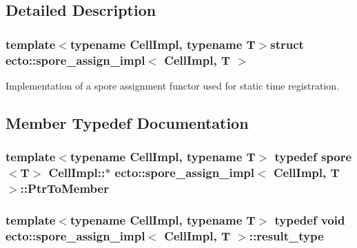 \subsection{Detailed Description}
\subsubsection*{template$<$typename Cell\-Impl, typename T$>$struct ecto\-::spore\-\_\-assign\-\_\-impl$<$ Cell\-Impl, T $>$}

Implementation of a spore assignment functor used for static time registration. 

\subsection{Member Typedef Documentation}
\hypertarget{structecto_1_1spore__assign__impl_a374a7ffdead1191878d49a6ef295ada6}{
\subsubsection[{Ptr\-To\-Member}]{\setlength{\rightskip}{0pt plus 5cm}template$<$typename Cell\-Impl, typename T$>$ typedef {\bf spore}$<$T$>$ Cell\-Impl\-::$\ast$ {\bf ecto\-::spore\-\_\-assign\-\_\-impl}$<$ Cell\-Impl, T $>$\-::{\bf Ptr\-To\-Member}}}\label{structecto_1_1spore__assign__impl_a374a7ffdead1191878d49a6ef295ada6}
\hypertarget{structecto_1_1spore__assign__impl_a4947968d387bce16aab17acdfd094019}{
\subsubsection[{result\-\_\-type}]{\setlength{\rightskip}{0pt plus 5cm}template$<$typename Cell\-Impl, typename T$>$ typedef void {\bf ecto\-::spore\-\_\-assign\-\_\-impl}$<$ Cell\-Impl, T $>$\-::{\bf result\-\_\-type}}}\label{structecto_1_1spore__assign__impl_a4947968d387bce16aab17acdfd094019}


